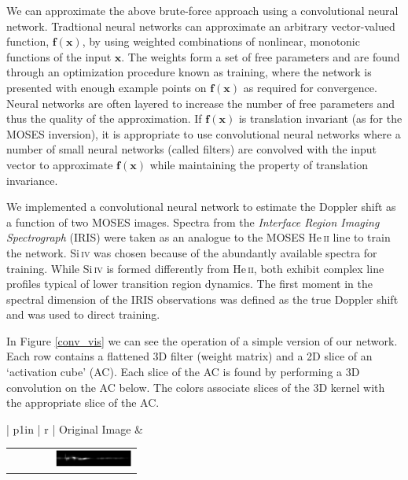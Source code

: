 \documentclass[landscape,paperwidth=46truein,paperheight=41truein,fontscale=0.3]{baposter}
\begin{document}
\begin{poster}
{\begin{center}
\begin{minipage}{0.98 \columnwidth}
\begin{multicols}{3}
				\hspace{8pt} We can approximate the above brute-force approach using a convolutional neural network. Tradtional neural networks can approximate an arbitrary vector-valued function, $\mathbf{f(\mathbf{x})}$, by using weighted combinations of nonlinear, monotonic functions of the input $\mathbf{x}$. %
				 The weights form a set of free parameters and are found through an optimization procedure known as training, where the network is presented with enough example points on $\mathbf{f}(\mathbf{x})$ as required for convergence. Neural networks are often layered to increase the number of free parameters and thus the quality of the approximation. If $\mathbf{f}(\mathbf{x})$ is translation invariant (as for the MOSES inversion), it is appropriate to use convolutional neural networks where a number of small neural networks (called filters) are convolved with the input vector to approximate $\mathbf{f}(\mathbf{x})$ while maintaining the property of translation invariance.
				
				\hspace{8pt} We implemented a convolutional neural network to estimate the Doppler shift as a function of two MOSES images. %
				  Spectra from the \textit{Interface Region Imaging Spectrograph} (IRIS) were taken as an analogue to the MOSES He\,\textsc{ii} line to train the network. Si\,\textsc{iv} was chosen because of the abundantly available spectra for training. While Si\,\textsc{iv} is formed differently from He\,\textsc{ii}, both exhibit complex line profiles typical of lower transition region dynamics. The first moment in the spectral dimension of the IRIS observations was defined as the true Doppler shift and was used to direct training.
				
				\hspace{8pt} In Figure \ref{conv_vis} we can see the operation of a simple version of our network.  Each row contains a flattened 3D filter (weight matrix) and a 2D slice of an `activation cube' (AC). Each slice of the AC is found by performing a 3D convolution on the AC below. The colors associate slices of the 3D kernel with the appropriate slice of the AC.
			

			\begin{center}
			\setlength{\tabcolsep}{.1em} %
			{\renewcommand{\arraystretch}{0.5}%
			\begin{tabular}{| p{1in} | r |} \hline
				 Original Image
				 &
				\begin{tabular}{c c c c | c}
					& & & & \includegraphics[width=1in]{../../../../src/python/minnd/model_plt/img_0_2_0_0}
				\end{tabular} \\ \hline
				 

\end{tabular}}
\end{center}
\end{multicols}
\end{minipage}
\end{center}}
\end{poster}
\end{document}
